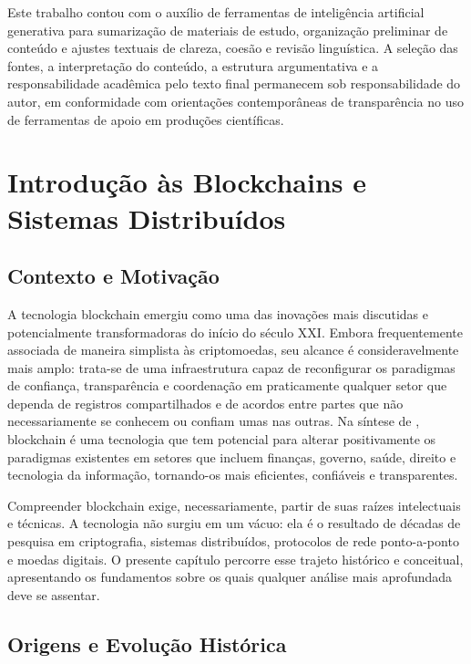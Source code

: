 \documentclass[12pt,a4paper]{report}
\begin{document}
Este trabalho contou com o auxílio de ferramentas de inteligência artificial generativa para sumarização de materiais de estudo, organização preliminar de conteúdo e ajustes textuais de clareza, coesão e revisão linguística. A seleção das fontes, a interpretação do conteúdo, a estrutura argumentativa e a responsabilidade acadêmica pelo texto final permanecem sob responsabilidade do autor, em conformidade com orientações contemporâneas de transparência no uso de ferramentas de apoio em produções científicas.

\tableofcontents
\clearpage
{}

\chapter{Introdução às Blockchains e Sistemas Distribuídos}

\section{Contexto e Motivação}

A tecnologia blockchain emergiu como uma das inovações mais discutidas e potencialmente transformadoras do início do século XXI. Embora frequentemente associada de maneira simplista às criptomoedas, seu alcance é consideravelmente mais amplo: trata-se de uma infraestrutura capaz de reconfigurar os paradigmas de confiança, transparência e coordenação em praticamente qualquer setor que dependa de registros compartilhados e de acordos entre partes que não necessariamente se conhecem ou confiam umas nas outras. Na síntese de \cite{Bashir2023}, blockchain é uma tecnologia que tem potencial para alterar positivamente os paradigmas existentes em setores que incluem finanças, governo, saúde, direito e tecnologia da informação, tornando-os mais eficientes, confiáveis e transparentes.

Compreender blockchain exige, necessariamente, partir de suas raízes intelectuais e técnicas. A tecnologia não surgiu em um vácuo: ela é o resultado de décadas de pesquisa em criptografia, sistemas distribuídos, protocolos de rede ponto-a-ponto e moedas digitais. O presente capítulo percorre esse trajeto histórico e conceitual, apresentando os fundamentos sobre os quais qualquer análise mais aprofundada deve se assentar.

\section{Origens e Evolução Histórica}
\end{document}
